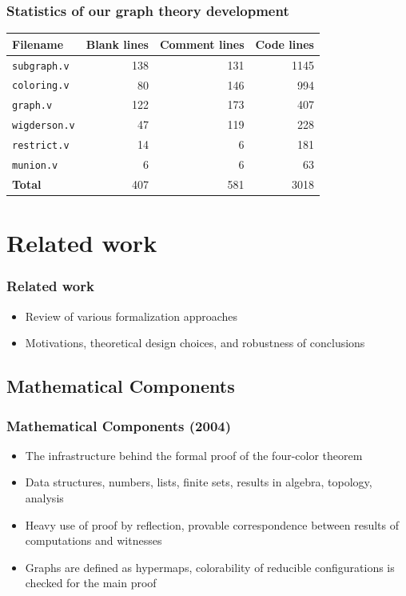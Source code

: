 \documentclass{beamer}
\begin{document}
\begin{frame}
\frametitle{Statistics of our graph theory development}
\begin{table}[htbp]
\centering
\begin{tabular}{lrrr}
\textbf{Filename} & \textbf{Blank lines} & \textbf{Comment lines} & \textbf{Code lines}\\[0pt]
\hline
\texttt{subgraph.v} & 138 & 131 & 1145\\[0pt]
\texttt{coloring.v} & 80 & 146 & 994\\[0pt]
\texttt{graph.v} & 122 & 173 & 407\\[0pt]
\texttt{wigderson.v} & 47 & 119 & 228\\[0pt]
\texttt{restrict.v} & 14 & 6 & 181\\[0pt]
\texttt{munion.v} & 6 & 6 & 63\\[0pt]
\hline
\textbf{Total} & 407 & 581 & 3018\\[0pt]
\end{tabular}
\end{table}
\end{frame}


\section{Related work}
\begin{frame}
\frametitle{Related work}
\begin{itemize}
\item Review of various formalization approaches
\item Motivations, theoretical design choices, and robustness of conclusions
\end{itemize}
\end{frame}

\subsection{Mathematical Components}
\begin{frame}
\frametitle{Mathematical Components (2004)}
\begin{itemize}
\item The infrastructure behind the formal proof of the four-color
  theorem
\item Data structures, numbers, lists, finite sets, results in
  algebra, topology, analysis
\item Heavy use of proof by reflection, provable correspondence
  between results of computations and witnesses
\item Graphs are defined as hypermaps, colorability of reducible
  configurations is checked for the main proof
\end{itemize}
\end{frame}
\end{document}
